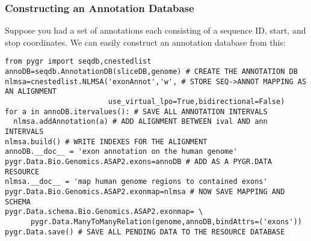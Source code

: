 \documentclass{howto}
\begin{document}
\subsubsection{Constructing an Annotation Database}
Suppose you had a set of annotations  each consisting of a sequence ID,
start, and stop coordinates.  We can easily construct an annotation database
from this:
\begin{verbatim}
from pygr import seqdb,cnestedlist
annoDB=seqdb.AnnotationDB(sliceDB,genome) # CREATE THE ANNOTATION DB
nlmsa=cnestedlist.NLMSA('exonAnnot','w', # STORE SEQ->ANNOT MAPPING AS AN ALIGNMENT
                        use_virtual_lpo=True,bidirectional=False)
for a in annoDB.itervalues(): # SAVE ALL ANNOTATION INTERVALS
  nlmsa.addAnnotation(a) # ADD ALIGNMENT BETWEEN ival AND ann INTERVALS
nlmsa.build() # WRITE INDEXES FOR THE ALIGNMENT
annoDB.__doc__ = 'exon annotation on the human genome'
pygr.Data.Bio.Genomics.ASAP2.exons=annoDB # ADD AS A PYGR.DATA RESOURCE
nlmsa.__doc__ = 'map human genome regions to contained exons'
pygr.Data.Bio.Genomics.ASAP2.exonmap=nlmsa # NOW SAVE MAPPING AND SCHEMA
pygr.Data.schema.Bio.Genomics.ASAP2.exonmap= \
      pygr.Data.ManyToManyRelation(genome,annoDB,bindAttrs=('exons'))
pygr.Data.save() # SAVE ALL PENDING DATA TO THE RESOURCE DATABASE
\end{verbatim}
\end{document}
